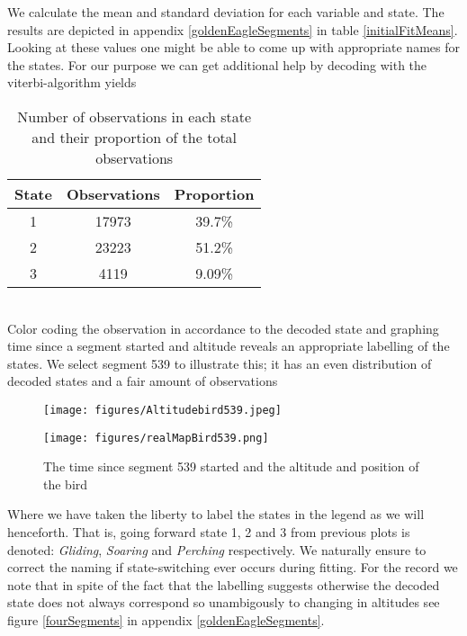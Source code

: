 We calculate the mean and standard deviation for each variable and state. The results are depicted in appendix \ref{goldenEagleSegments} in table \ref{initialFitMeans}. Looking at these values one might be able to come up with appropriate names for the states. For our purpose we can get additional help by decoding with the viterbi-algorithm yields
\begin{table}[h]
    \centering
    \begin{tabular}{ccc}
        \hline
        \textbf{State} & \textbf{Observations} & \textbf{Proportion} \\
        \hline
        1 & 17973 & 39.7\% \\
        2 & 23223 & 51.2\% \\
        3 & 4119 & 9.09\% \\
        \hline
    \end{tabular}
    \caption{Number of observations in each state and their proportion of the total observations}
    \label{estimWeight1}
\end{table}\\
Color coding the observation in accordance to the decoded state and graphing time since a segment started and altitude reveals an appropriate labelling of the states. We select segment 539 to illustrate this; it has an even distribution of decoded states and a fair amount of observations
\begin{figure}[h]
  \centering
  \begin{minipage}[b]{0.49\textwidth}
    \texttt{[image: figures/Altitudebird539.jpeg]}
  \end{minipage}
  \hfill
  \begin{minipage}[b]{0.49\textwidth}
    \texttt{[image: figures/realMapBird539.png]}
  \end{minipage}
  \caption{The time since segment 539 started and the altitude and position of the bird}
  \label{bird539}
\end{figure}
Where we have taken the liberty to label the states in the legend as we will henceforth. That is,
going forward state 1, 2 and 3 from previous plots is denoted: \textit{Gliding}, \textit{Soaring} and \textit{Perching} respectively. We naturally ensure to correct the naming if state-switching ever occurs during fitting. For the record we note that in spite of the fact that the labelling suggests otherwise the decoded state does not always correspond so unambigously to changing in altitudes see figure \ref{fourSegments} in appendix \ref{goldenEagleSegments}.
